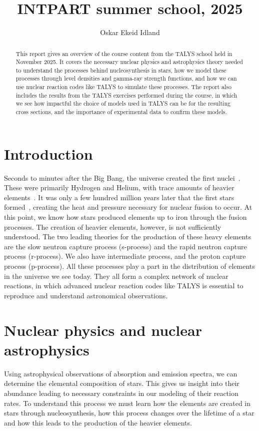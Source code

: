 \documentclass[english, notitlepage]{article}
\title{INTPART summer school, 2025}
\author{Oskar Ekeid Idland}
\begin{document}
\maketitle
\begin{abstract}
This report gives an overview of the course content from the TALYS school held in November 2025. It covers the necessary nuclear physics and astrophysics theory needed to understand the processes behind nucleosynthesis in stars, how we model these processes through level densities and gamma-ray strength functions, and how we can use nuclear reaction codes like TALYS to simulate these processes. The report also includes the results from the TALYS exercises performed during the course, in which we see how impactful the choice of models used in TALYS can be for the resulting cross sections, and the importance of experimental data to confirm these models. 
\end{abstract}

\section{Introduction}
Seconds to minutes after the Big Bang, the universe created the first nuclei~\cite{nasa:universe-overview}. These were primarily Hydrogen and Helium, with trace amounts of heavier elements~\cite{gorgen:presentations}. It was only a few hundred million years later that the first stars formed~\cite{nasa:universe-overview}, creating the heat and pressure necessary for nuclear fusion to occur. At this point, we know how stars produced elements up to iron through the fusion processes. The creation of heavier elements, however, is not sufficiently understood. The two leading theories for the production of these heavy elements are the slow neutron capture process (s-process) and the rapid neutron capture process (r-process). We also have intermediate process, and the proton capture process (p-process). All these processes play a part in the distribution of elements in the universe we see today. They all form a complex network of nuclear reactions, in which advanced nuclear reaction codes like TALYS \cite{TALYS} is essential to reproduce and understand astronomical observations.
 
\section{Nuclear physics and nuclear astrophysics}
Using astrophysical observations of absorption and emission spectra, we can determine the elemental composition of stars. This gives us insight into their abundance leading to necessary constraints in our modeling of their reaction rates. To understand this process we must learn how the elements are created in stars through nucleosynthesis, how this process changes over the lifetime of a star and how this leads to the production of the heavier elements.  
\end{document}
